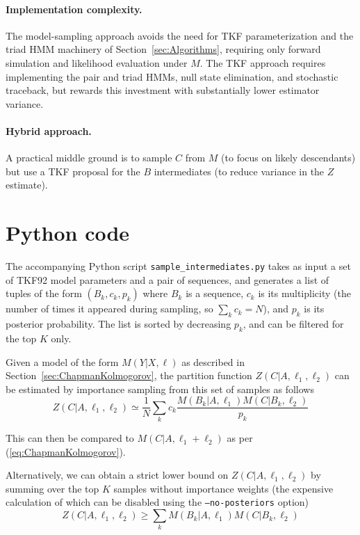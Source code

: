 \documentclass{article}
\newcommand\eqnlabel[1]{\label{eq:#1}}
\newcommand\eqnref[1]{(\ref{eq:#1})}
\newcommand\secref[1]{Section~\ref{sec:#1}}
\begin{document}
\paragraph{Implementation complexity.}
The model-sampling approach avoids the need for TKF parameterization and the
triad HMM machinery of \secref{Algorithms}, requiring only forward simulation
and likelihood evaluation under $M$.
The TKF approach requires implementing the pair and triad HMMs,
null state elimination, and stochastic traceback,
but rewards this investment with substantially lower estimator variance.

\paragraph{Hybrid approach.}
A practical middle ground is to sample $C$ from $M$ (to focus on likely descendants)
but use a TKF proposal for the $B$ intermediates (to reduce variance in the $Z$ estimate).


\section{Python code}

The accompanying Python script {\tt sample\_intermediates.py}
takes as input a set of TKF92 model parameters and a pair of sequences,
and generates a list of tuples of the form $(B_k,c_k,p_k)$
where $B_k$ is a sequence,
$c_k$ is its multiplicity (the number of times it appeared during sampling, so $\sum_k c_k = N$),
and $p_k$ is its posterior probability.
The list is sorted by decreasing $p_k$, and can be filtered for the top $K$ only.

Given a model of the form $M(Y|X,\ell)$ as described in \secref{ChapmanKolmogorov},
the partition function $Z(C|A,\ell_1,\ell_2)$ can be estimated by importance sampling from this set of samples
as follows
\begin{equation}
Z(C|A,\ell_1,\ell_2) \simeq \frac{1}{N} \sum_k c_k \frac{M(B_k|A,\ell_1) M(C|B_k,\ell_2)}{p_k}
\eqnlabel{ImportanceSample}
\end{equation}

This can then be compared to $M(C|A,\ell_1+\ell_2)$ as per \eqnref{ChapmanKolmogorov}.

Alternatively, we can obtain a strict lower bound on $Z(C|A,\ell_1,\ell_2)$ by summing over the top $K$
samples without importance weights (the expensive calculation of which can be disabled using the {\tt --no-posteriors} option)
\begin{equation}
Z(C|A,\ell_1,\ell_2) \geq \sum_k M(B_k|A,\ell_1) M(C|B_k,\ell_2)
\eqnlabel{LowerBound}
\end{equation}
\end{document}

